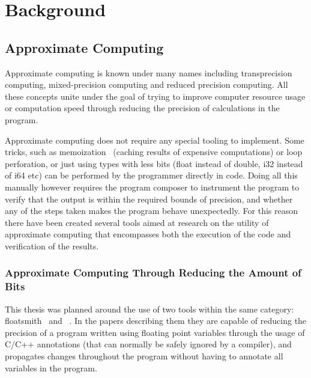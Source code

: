 \section{Background} 

\subsection{Approximate Computing}
Approximate computing is known under many names including transprecision computing, mixed-precision computing and reduced precision computing.
All these concepts unite under the goal of trying to improve computer resource usage or computation speed through reducing the precision of calculations in the program. 

Approximate computing does not require any special tooling to implement. Some tricks, such as memoization~\citep{mittal2016survey} (caching results of expensive computations) or loop perforation\citep{li2018sculptor}, or just using types with less bits (float instead of double, i32 instead of i64 etc)\citep{cherubin2019taffo, tagliavini2018flexfloat, floatsmith_paper} can be performed by the programmer directly in code. Doing all this manually however requires the program composer to instrument the program to verify that the output is within the required bounds of precision, and whether any of the steps taken makes the program behave unexpectedly. For this reason there have been created several tools aimed at research on the utility of approximate computing that encompasses both the execution of the code and verification of the results. 

\subsubsection{Approximate Computing Through Reducing the Amount of Bits}
\label{section:approximate_computing_through_reducing_bits}

This thesis was planned around the use of two tools within the same category: floatsmith~\citep{floatsmith_paper} and \taffo{}~\citep{cherubin2019taffo}. In the papers describing them they are capable of reducing the precision of a program written using floating point variables through the usage of C/C++ annotations (that can normally be safely ignored by a compiler), and propagates changes throughout the program without having to annotate all variables in the program.


